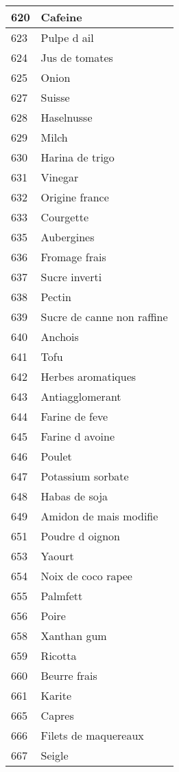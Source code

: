 \begin{longtable}{|l|l|}
620 & Cafeine \\ \hline 
623 & Pulpe d ail \\ \hline 
624 & Jus de tomates \\ \hline 
625 & Onion \\ \hline 
627 & Suisse \\ \hline 
628 & Haselnusse \\ \hline 
629 & Milch \\ \hline 
630 & Harina de trigo \\ \hline 
631 & Vinegar \\ \hline 
632 & Origine france \\ \hline 
633 & Courgette \\ \hline 
635 & Aubergines \\ \hline 
636 & Fromage frais \\ \hline 
637 & Sucre inverti \\ \hline 
638 & Pectin \\ \hline 
639 & Sucre de canne non raffine \\ \hline 
640 & Anchois \\ \hline 
641 & Tofu \\ \hline 
642 & Herbes aromatiques \\ \hline 
643 & Antiagglomerant \\ \hline 
644 & Farine de feve \\ \hline 
645 & Farine d avoine \\ \hline 
646 & Poulet \\ \hline 
647 & Potassium sorbate \\ \hline 
648 & Habas de soja \\ \hline 
649 & Amidon de mais modifie \\ \hline 
651 & Poudre d oignon \\ \hline 
653 & Yaourt \\ \hline 
654 & Noix de coco rapee \\ \hline 
655 & Palmfett \\ \hline 
656 & Poire \\ \hline 
658 & Xanthan gum \\ \hline 
659 & Ricotta \\ \hline 
660 & Beurre frais \\ \hline 
661 & Karite \\ \hline 
665 & Capres \\ \hline 
666 & Filets de maquereaux \\ \hline 
667 & Seigle \\ \hline 

\end{longtable}
